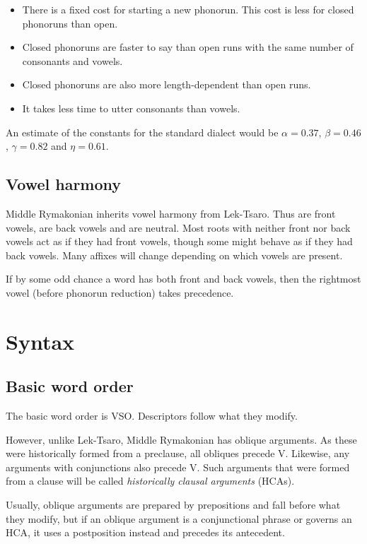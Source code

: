 \documentclass{book}
\newcommand{\lname}{Middle Rymakonian}
\begin{document}
\begin{itemize}
  \item There is a fixed cost for starting a new phonorun. This cost is less for closed phonoruns than open.
  \item Closed phonoruns are faster to say than open runs with the same number of consonants and vowels.
  \item Closed phonoruns are also more length-dependent than open runs.
  \item It takes less time to utter consonants than vowels.
\end{itemize}

An estimate of the constants for the standard dialect would be $\alpha = 0.37$, $\beta = 0.46$, $\gamma = 0.82$ and $\eta = 0.61$.

\section{Vowel harmony}

\lname{} inherits vowel harmony from Lek-Tsaro. Thus  are front vowels,  are back vowels and  are neutral. Most roots with neither front nor back vowels act as if they had front vowels, though some might behave as if they had back vowels. Many affixes will change depending on which vowels are present.

If by some odd chance a word has both front and back vowels, then the rightmost vowel (before phonorun reduction) takes precedence.

\chapter{Syntax}

\section{Basic word order}

The basic word order is VSO. Descriptors follow what they modify.

However, unlike Lek-Tsaro, \lname{} has oblique arguments. As these were historically formed from a preclause, all obliques precede V. Likewise, any arguments with conjunctions also precede V. Such arguments that were formed from a clause will be called \emph{historically clausal arguments} (HCAs).

Usually, oblique arguments are prepared by prepositions and fall before what they modify, but if an oblique argument is a conjunctional phrase or governs an HCA, it uses a postposition instead and precedes its antecedent.
\end{document}
